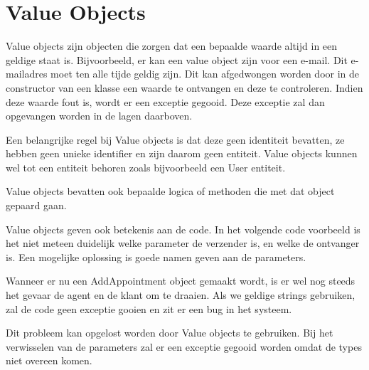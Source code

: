 
\section{Value Objects}
\label{sec:value-objects}

Value objects zijn objecten die zorgen dat een bepaalde waarde altijd in een geldige staat is. Bijvoorbeeld, er kan een value object zijn voor een e-mail. Dit e-mailadres moet ten alle tijde geldig zijn. Dit kan afgedwongen worden door in de constructor van een klasse een waarde te ontvangen en deze te controleren. Indien deze waarde fout is, wordt er een exceptie gegooid. Deze exceptie zal dan opgevangen worden in de lagen daarboven.

Een belangrijke regel bij Value objects is dat deze geen identiteit bevatten, ze hebben geen unieke identifier en zijn daarom geen entiteit. Value objects kunnen wel tot een entiteit behoren zoals bijvoorbeeld een User entiteit.

Value objects bevatten ook bepaalde logica of methoden die met dat object gepaard gaan.

Value objects geven ook betekenis aan de code. In het volgende code voorbeeld is het niet meteen duidelijk welke parameter de verzender is, en welke de ontvanger is. Een mogelijke oplossing is goede namen geven aan de parameters.


Wanneer er nu een AddAppointment object gemaakt wordt, is er wel nog steeds het gevaar de agent en de klant om te draaien. Als we geldige strings gebruiken, zal de code geen exceptie gooien en zit er een bug in het systeem.

Dit probleem kan opgelost worden door Value objects te gebruiken. Bij het verwisselen van de parameters zal er een exceptie gegooid worden omdat de types niet overeen komen.

